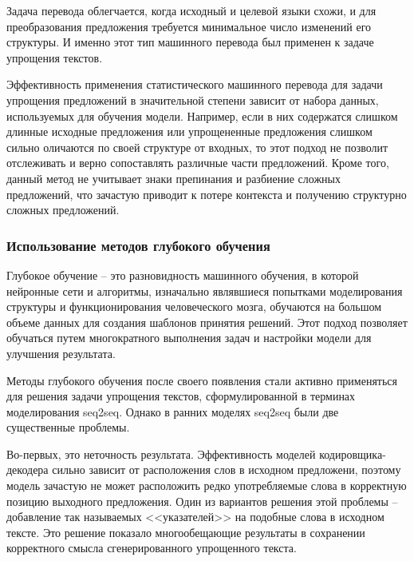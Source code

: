 Задача перевода облегчается, когда исходный и целевой языки схожи, и для преобразования предложения требуется минимальное число изменений его структуры. И именно этот тип машинного перевода был применен к задаче упрощения текстов\cite{shardlow_survey_2014}.



Эффективность применения статистического машинного перевода для задачи упрощения предложений в значительной степени зависит от набора данных, используемых для обучения модели. Например, если в них содержатся слишком длинные исходные предложения или упрощененные предложения слишком сильно оличаются по своей структуре от входных, то этот подход не позволит отслеживать и верно сопоставлять различные части предложений. Кроме того, данный метод не учитывает знаки препинания и разбиение сложных предложений, что зачастую приводит к потере контекста и получению структурно сложных предложений.


\subsubsection{Использование методов глубокого обучения}

Глубокое обучение -- это разновидность машинного обучения, в которой нейронные сети и алгоритмы, изначально являвшиеся попытками моделирования структуры и функционирования человеческого мозга, обучаются на большом объеме данных для создания шаблонов принятия решений. Этот подход позволяет обучаться путем многократного выполнения задач и настройки модели для улучшения результата\cite{deep}.

Методы глубокого обучения после своего появления стали активно применяться для решения задачи упрощения текстов, сформулированной в терминах моделирования seq2seq. Однако в ранних моделях seq2seq были две существенные проблемы.

Во-первых, это неточность результата. Эффективность моделей кодировщика-декодера сильно зависит от расположения слов в исходном предложени, поэтому модель зачастую не может расположить редко употребляемые слова в корректную позицию выходного предложения. Один из вариантов решения этой проблемы -- добавление так называемых <<указателей>> на подобные слова в исходном тексте\cite{nisioi_exploring_2017}. Это решение показало многообещающие результаты в сохранении корректного смысла сгенерированного упрощенного текста.

